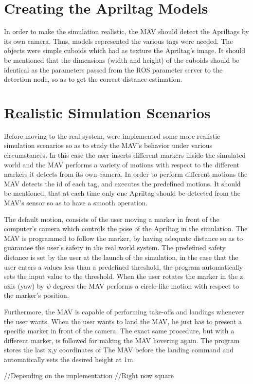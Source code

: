 \section{Creating the Apriltag Models}
\label{sec:cubeRobots}

In order to make the simulation realistic, the MAV should detect the Apriltags by its own camera. Thus, models represented the various tags were needed. The objects were simple cuboids which had as texture the Apriltag's image. It should be mentioned that the dimensions (width and height) of the cuboids should be identical as the parameters passed from the ROS parameter server to the detection node, so as to get the correct distance estimation. 

\section{Realistic Simulation Scenarios}
\label{sec: apriltagFireflySimulation}

Before moving to the real system, were implemented some more realistic simulation scenarios so as to study the MAV's behavior under various circumstances. In this case the user inserts different markers inside the simulated world and the MAV performs a variety of motions with respect to the different markers it detects from its own camera. In order to perform different motions the MAV detects the id of each tag, and executes the predefined motions. It should be mentioned, that at each time only one Apriltag should be detected from the MAV's sensor so as to have a smooth operation.

The default motion, consists of the user moving a marker in front of the computer's camera which controls the pose of the Apriltag in the simulation. The MAV is programmed to follow the marker, by having adequate distance so as to guarantee the user's safety in the real world system. The predefined safety distance is set by the user at the launch of the simulation, in the case that the user enters a values less than a predefined threshold, the program automatically sets the input value to the threshold. When the user rotates the marker in the z axis (yaw) by $\psi$ degrees the MAV performs a circle-like motion with respect to the marker's position. 

Furthermore, the MAV is capable of performing take-offs and landings whenever the user wants. When the user wants to land the MAV, he just has to present a specific marker in front of the camera. The exact same procedure, but with a different marker, is followed for making the MAV hovering again. The program stores the last x,y coordinates of The MAV before the landing command and automatically sets the desired height at 1m. 

//Depending on the implementation //Right now square    





















  